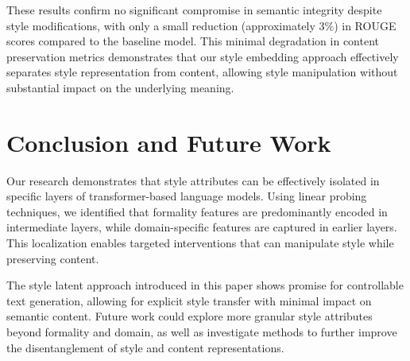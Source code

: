 \documentclass[twocolumn]{article}
\begin{document}
These results confirm no significant compromise in semantic integrity despite style modifications, with only a small reduction (approximately 3\%) in ROUGE scores compared to the baseline model. This minimal degradation in content preservation metrics demonstrates that our style embedding approach effectively separates style representation from content, allowing style manipulation without substantial impact on the underlying meaning.

\section{Conclusion and Future Work}

Our research demonstrates that style attributes can be effectively isolated in specific layers of transformer-based language models. Using linear probing techniques, we identified that formality features are predominantly encoded in intermediate layers, while domain-specific features are captured in earlier layers. This localization enables targeted interventions that can manipulate style while preserving content.

The style latent approach introduced in this paper shows promise for controllable text generation, allowing for explicit style transfer with minimal impact on semantic content. Future work could explore more granular style attributes beyond formality and domain, as well as investigate methods to further improve the disentanglement of style and content representations.


\small

\end{document}
